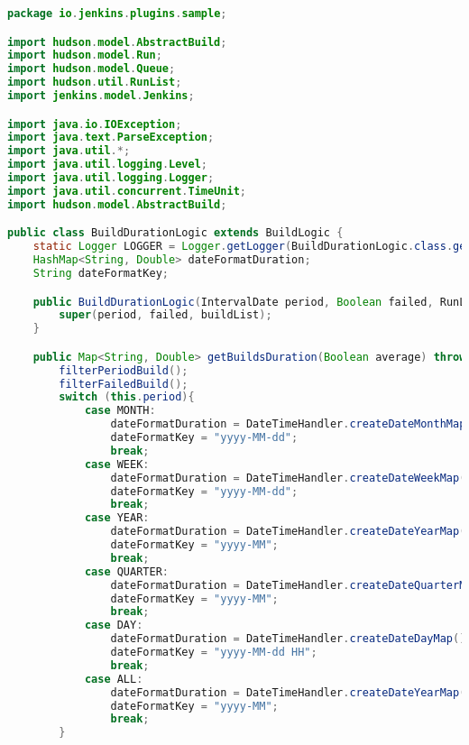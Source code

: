 \begin{lstlisting}[language=Java]
package io.jenkins.plugins.sample;

import hudson.model.AbstractBuild;
import hudson.model.Run;
import hudson.model.Queue;
import hudson.util.RunList;
import jenkins.model.Jenkins;

import java.io.IOException;
import java.text.ParseException;
import java.util.*;
import java.util.logging.Level;
import java.util.logging.Logger;
import java.util.concurrent.TimeUnit;
import hudson.model.AbstractBuild;

public class BuildDurationLogic extends BuildLogic {
    static Logger LOGGER = Logger.getLogger(BuildDurationLogic.class.getName());
    HashMap<String, Double> dateFormatDuration;
    String dateFormatKey;

    public BuildDurationLogic(IntervalDate period, Boolean failed, RunList<Run> buildList) {
        super(period, failed, buildList);
    }

    public Map<String, Double> getBuildsDuration(Boolean average) throws ParseException {
        filterPeriodBuild();
        filterFailedBuild();
        switch (this.period){
            case MONTH:
                dateFormatDuration = DateTimeHandler.createDateMonthMap();
                dateFormatKey = "yyyy-MM-dd";
                break;
            case WEEK:
                dateFormatDuration = DateTimeHandler.createDateWeekMap();
                dateFormatKey = "yyyy-MM-dd";
                break;
            case YEAR:
                dateFormatDuration = DateTimeHandler.createDateYearMap();
                dateFormatKey = "yyyy-MM";
                break;
            case QUARTER:
                dateFormatDuration = DateTimeHandler.createDateQuarterMap();
                dateFormatKey = "yyyy-MM";
                break;
            case DAY:
                dateFormatDuration = DateTimeHandler.createDateDayMap();
                dateFormatKey = "yyyy-MM-dd HH";
                break;
            case ALL:
                dateFormatDuration = DateTimeHandler.createDateYearMap();
                dateFormatKey = "yyyy-MM";
                break;
        }



\end{lstlisting}
